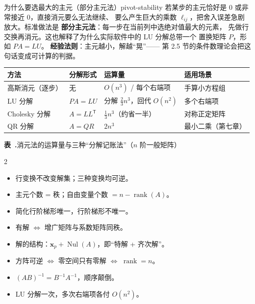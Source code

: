 \documentclass[11pt,a4paper,openany]{ctexbook}
\DeclareMathOperator{\rank}{rank}
\DeclareMathOperator{\Nul}{Nul}
\newcounter{tabnum}[chapter]
\newenvironment{latab}[1]{%
  \par\addvspace{9pt}%
  \stepcounter{tabnum}%
  \gdef\latabcap{#1}%
  \begin{center}%
  \begin{minipage}{0.94\textwidth}%
}{%
  \end{minipage}%
  \par\vspace{4pt}%
  {\small\sffamily\color{qing}\textbf{表~\thechapter.\arabic{tabnum}}\quad \latabcap\par}%
  \vspace{3pt}%
  \end{center}%
  \addvspace{8pt}%
}
\begin{document}
\begin{remk}{为什么要选最大的主元（部分主元法）}{pivot-stability}
若某步的主元恰好是 $0$ 或非常接近 $0$，直接消元要么无法继续、
要么产生巨大的乘数 $\ell_{ij}$，把舍入误差急剧放大。标准做法是
\textbf{部分主元法}：每一步在当前列中选绝对值最大的元素，
先做行交换再消元。这也解释了为什么实际软件中的 LU 分解总带一个
置换矩阵 $P$，形如 $PA=LU$。
\textbf{经验法则}：主元越小，解越“晃”——
第 2.5 节的条件数理论会把这句话变成可计算的判据。
\end{remk}

\begin{latab}{消元法的运算量与三种“分解记账法”（$n$ 阶一般矩阵）}
\centering\small
\begin{tabular}{@{}llll@{}}
\toprule
方法 & 分解形式 & 运算量 & 适用场景\\
\midrule
高斯消元（逐步） & 无 & $O(n^3)$ / 每个右端项 & 手算小方程组\\
LU 分解 & $PA=LU$ & 分解 $\tfrac23n^3$，回代 $O(n^2)$ & 多个右端项\\
Cholesky 分解 & $A=LL^{\mathsf T}$ & $\tfrac13n^3$（约省一半） & 对称正定矩阵\\
QR 分解 & $A=QR$ & $2n^3$ & 最小二乘（第七章）\\
\bottomrule
\end{tabular}
\end{latab}

\begin{chapkeys}
\small
\begin{multicols}{2}
\begin{itemize}[leftmargin=1.5em, itemsep=2pt]
\item 行变换不改变解集；三种变换均可逆。
\item 主元个数 = 秩；自由变量个数 $=n-\rank(A)$。
\item 简化行阶梯形唯一，行阶梯形不唯一。
\item 有解 $\Leftrightarrow$ 增广矩阵与系数矩阵同秩。
\item 解的结构：$\boldsymbol{x}_p+\Nul(A)$，即“特解 + 齐次解”。
\item 方阵可逆 $\Leftrightarrow$ 零空间只有零解 $\Leftrightarrow$ $\rank=n$。
\item $(AB)^{-1}=B^{-1}A^{-1}$，顺序颠倒。
\item LU 分解一次，多次右端项各付 $O(n^2)$。
\end{itemize}
\end{multicols}
\end{chapkeys}
\end{document}
